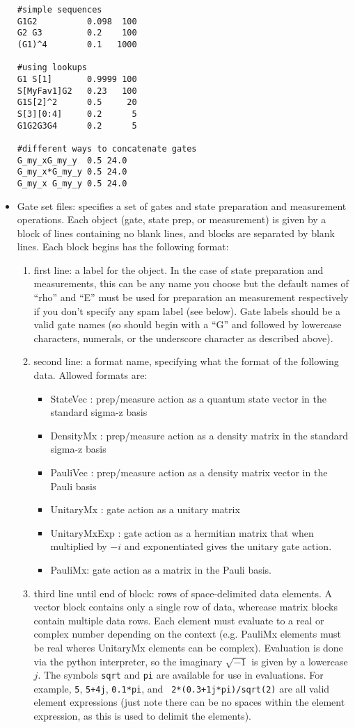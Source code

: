 \documentclass{article}[11pt]
\begin{document}
\begin{itemize}
\begin{lstlisting}[frame=single,caption=Example data file]
#simple sequences
G1G2          0.098  100
G2 G3         0.2    100
(G1)^4        0.1   1000

#using lookups
G1 S[1]       0.9999 100
S[MyFav1]G2   0.23   100
G1S[2]^2      0.5     20
S[3][0:4]     0.2      5
G1G2G3G4      0.2      5

#different ways to concatenate gates
G_my_xG_my_y  0.5 24.0
G_my_x*G_my_y 0.5 24.0
G_my_x G_my_y 0.5 24.0
\end{lstlisting}


\item Gate set files: specifies a set of gates and state preparation and measurement operations.  Each object (gate, state prep, or measurement) is given by a block of lines containing no blank lines, and blocks are separated by blank lines.  Each block begins has the following format:
\begin{enumerate}
\item first line: a label for the object.  In the case of state preparation and measurements, this can be any name you choose but the default names of ``rho'' and ``E'' must be used for preparation an measurement respectively if you don't specify any spam label (see below).  Gate labels should be a valid gate names (so should begin with a ``G'' and followed by lowercase characters, numerals, or the underscore character as described above).
\item second line: a format name, specifying what the format of the following data.  Allowed formats are:
  \begin{itemize}
    \item StateVec : prep/measure action as a quantum state vector in the standard sigma-z basis
    \item DensityMx : prep/measure action as a density matrix in the standard sigma-z basis
    \item PauliVec : prep/measure action as a density matrix vector in the Pauli basis
    \item UnitaryMx : gate action as a unitary matrix
    \item UnitaryMxExp : gate action as a hermitian matrix that when multiplied by $-i$ and exponentiated gives the unitary gate action.
    \item PauliMx: gate action as a matrix in the Pauli basis.
  \end{itemize}
\item third line until end of block:  rows of space-delimited data elements.  A vector block contains only a single row of data, wherease matrix blocks contain multiple data rows.  Each element must evaluate to a real or complex number depending on the context (e.g. PauliMx elements must be real wheres UnitaryMx elements can be complex).  Evaluation is done via the python interpreter, so the imaginary $\sqrt{-1}$ is given by a lowercase $j$. The symbols \texttt{sqrt} and \texttt{pi} are available for use in evaluations. For example, \texttt{5}, \texttt{5+4j}, \texttt{0.1*pi}, and \texttt{ 2*(0.3+1j*pi)/sqrt(2)} are all valid element expressions (just note there can be no spaces within the element expression, as this is used to delimit the elements).

\end{enumerate}
\end{itemize}
\end{document}
